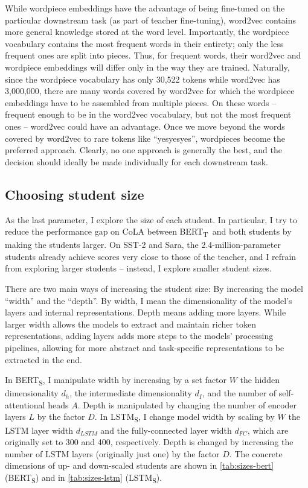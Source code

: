 \documentclass[bsc,frontabs,twoside,singlespacing,parskip,deptreport]{infthesis}
\def\BERTT{BERT\textsubscript{T}}
\def\BERTS{BERT\textsubscript{S}}
\def\LSTMS{LSTM\textsubscript{S}}
\begin{document}
{{{      While wordpiece embeddings have the advantage of being fine-tuned on the particular downstream task (as part of teacher fine-tuning), word2vec contains more general knowledge stored at the word level.
      Importantly, the wordpiece vocabulary contains the most frequent words in their entirety; only the less frequent ones are split into pieces.
      Thus, for frequent words, their word2vec and wordpiece embeddings will differ only in the way they are trained.
      Naturally, since the wordpiece vocabulary has only 30,522 tokens while word2vec has 3,000,000, there are many words covered by word2vec for which the wordpiece embeddings have to be assembled from multiple pieces. On these words -- frequent enough to be in the word2vec vocabulary, but not the most frequent ones -- word2vec could have an advantage.
      Once we move beyond the words covered by word2vec to rare tokens like ``yesyesyes'', wordpieces become the preferred approach.
      Clearly, no one approach is generally the best, and the decision should ideally be made individually for each downstream task.
    }

    \subsection{Choosing student size}{
      As the last parameter, I explore the size of each student. In particular, I try to reduce the performance gap on CoLA between \BERTT~and both students by making the students larger. On SST-2 and Sara, the 2.4-million-parameter students already achieve scores very close to those of the teacher, and I refrain from exploring larger students -- instead, I explore smaller student sizes.

      There are two main ways of increasing the student size: By increasing the model ``width'' and the ``depth''. By width, I mean the dimensionality of the model's layers and internal representations. Depth means adding more layers. While larger width allows the models to extract and maintain richer token representations, adding layers adds more steps to the models' processing pipelines, allowing for more abstract and task-specific representations to be extracted in the end.

      In \BERTS, I manipulate width by increasing by a set factor $W$ the hidden dimensionality $d_h$, the intermediate dimensionality $d_I$, and the number of self-attentional heads $A$. Depth is manipulated by changing the number of encoder layers $L$ by the factor $D$.
      In \LSTMS, I change model width by scaling by $W$ the LSTM layer width $d_{LSTM}$ and the fully-connected layer width $d_{FC}$, which are originally set to 300 and 400, respectively. Depth is changed by increasing the number of LSTM layers (originally just one) by the factor $D$.
      The concrete dimensions of up- and down-scaled students are shown in \autoref{tab:sizes-bert} (\BERTS) and in \autoref{tab:sizes-lstm} (\LSTMS).

}}}
\end{document}
